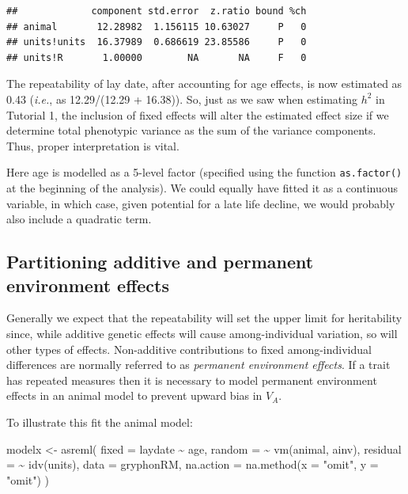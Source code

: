 \documentclass[
  12pt,
]{book}
\newenvironment{Shaded}{\begin{snugshade}}{\end{snugshade}}
\newcommand{\AttributeTok}[1]{\textcolor[rgb]{0.77,0.63,0.00}{#1}}
\newcommand{\FunctionTok}[1]{\textcolor[rgb]{0.00,0.00,0.00}{#1}}
\newcommand{\NormalTok}[1]{#1}
\newcommand{\OtherTok}[1]{\textcolor[rgb]{0.56,0.35,0.01}{#1}}
\newcommand{\SpecialCharTok}[1]{\textcolor[rgb]{0.00,0.00,0.00}{#1}}
\newcommand{\StringTok}[1]{\textcolor[rgb]{0.31,0.60,0.02}{#1}}
\begin{document}
\begin{Shaded}
\end{Shaded}

\begin{verbatim}
##             component std.error  z.ratio bound %ch
## animal       12.28982  1.156115 10.63027     P   0
## units!units  16.37989  0.686619 23.85586     P   0
## units!R       1.00000        NA       NA     F   0
\end{verbatim}

The repeatability of lay date, after accounting for age effects, is now estimated as 0.43 (\emph{i.e.}, as 12.29/(12.29 + 16.38)). So, just as we saw when estimating \(h^2\) in Tutorial 1, the inclusion of fixed effects will alter the estimated effect size if we determine total phenotypic variance as the sum of the variance components. Thus, proper interpretation is vital.

Here age is modelled as a 5-level factor (specified using the function \texttt{as.factor()} at the beginning of the analysis). We could equally have fitted it as a continuous variable, in which case, given potential for a late life decline, we would probably also include a quadratic term.

\hypertarget{partitioning-additive-and-permanent-environment-effects}{%
\subsection{Partitioning additive and permanent environment effects}\label{partitioning-additive-and-permanent-environment-effects}}

Generally we expect that the repeatability will set the upper limit for heritability since, while additive genetic effects will cause among-individual variation, so will other types of effects. Non-additive contributions to fixed among-individual differences are normally referred to as \emph{permanent environment effects}. If a trait has repeated measures then it is necessary to model permanent environment effects in an animal model to prevent upward bias in \(V_A\).

To illustrate this fit the animal model:

\begin{Shaded}
\begin{Highlighting}[]
\NormalTok{modelx }\OtherTok{\textless{}{-}} \FunctionTok{asreml}\NormalTok{(}
  \AttributeTok{fixed =}\NormalTok{ laydate }\SpecialCharTok{\textasciitilde{}}\NormalTok{ age,}
  \AttributeTok{random =} \SpecialCharTok{\textasciitilde{}} \FunctionTok{vm}\NormalTok{(animal, ainv),}
  \AttributeTok{residual =} \SpecialCharTok{\textasciitilde{}} \FunctionTok{idv}\NormalTok{(units),}
  \AttributeTok{data =}\NormalTok{ gryphonRM,}
  \AttributeTok{na.action =} \FunctionTok{na.method}\NormalTok{(}\AttributeTok{x =} \StringTok{"omit"}\NormalTok{, }\AttributeTok{y =} \StringTok{"omit"}\NormalTok{)}
\NormalTok{)}
\end{Highlighting}
\end{Shaded}
\end{document}
